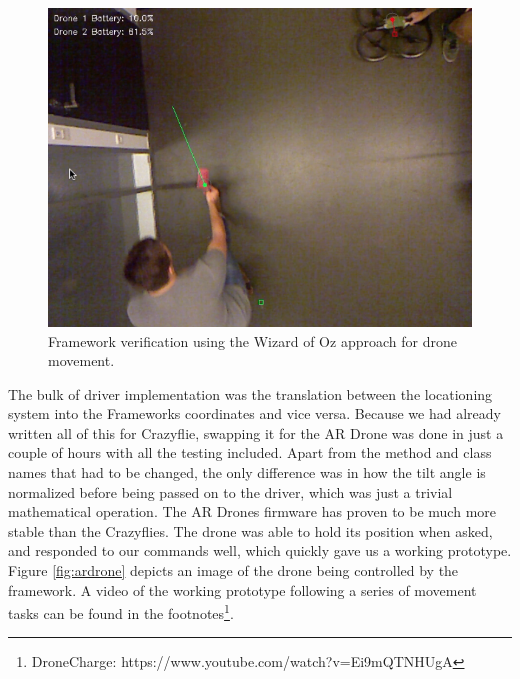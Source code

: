 \begin{figure}[h]
\centering
\includegraphics[width=\columnwidth]{images/wizardofoz.png}
\caption{Framework verification using the Wizard of Oz approach for drone movement.}
\label{fig:wizardofoz}
\end{figure}

The bulk of driver implementation was the translation between the locationing system into the Frameworks coordinates and vice versa. Because we had already written all of this for Crazyflie, swapping it for the AR Drone was done in just a couple of hours with all the testing included. Apart from the method and class names that had to be changed, the only difference was in how the tilt angle is normalized before being passed on to the driver, which was just a trivial mathematical operation. The AR Drones firmware has proven to be much more stable than the Crazyflies. The drone was able to hold its position when asked, and responded to our commands well, which quickly gave us a working prototype. Figure \ref{fig:ardrone} depicts an image of the drone being controlled by the framework. A video of the working prototype following a series of movement tasks can be found in the footnotes\footnote{DroneCharge: https://www.youtube.com/watch?v=Ei9mQTNHUgA}.

